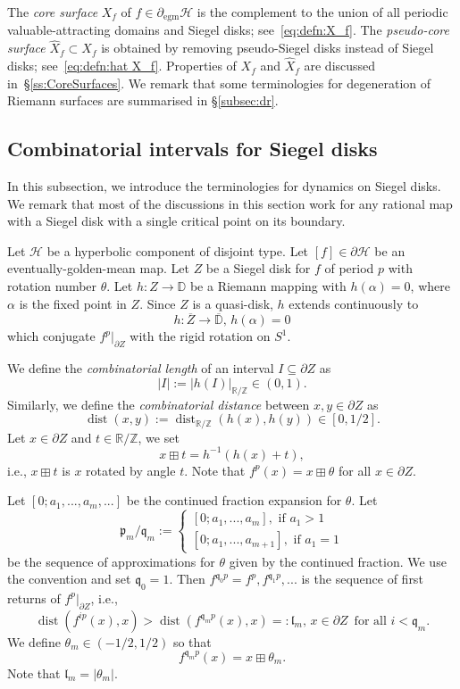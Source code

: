 \documentclass[11pt, reqno]{amsart}
\numberwithin{equation}{section}
\theoremstyle{plain}
\theoremstyle{theorem}
\theoremstyle{plain}
\theoremstyle{definition}
\newcommand{\R}{\mathbb{R}}
\newcommand{\Z}{\mathbb{Z}}
\newcommand{\D}{\mathbb{D}}
\DeclareMathOperator{\dist}{dist}
\numberwithin{figure}{section}
\newcommand{\egm}{{\operatorname{egm}}}
\begin{document}
The \emph{core surface} $X_f$ of $f\in \partial_\egm \mathcal H$ is the complement to the union of all periodic valuable-attracting domains and Siegel disks; see~\eqref{eq:defn:X_f}. The \emph{pseudo-core surface} $\widehat X_f\subset X_f$ is obtained by removing pseudo-Siegel disks instead of Siegel disks; see~\eqref{eq:defn:hat X_f}.  Properties of $X_f$ and $\widehat X_f$ are discussed in~\S\ref{ss:CoreSurfaces}.
We remark that some terminologies for degeneration of Riemann surfaces are summarised in \S \ref{subsec:dr}.


\subsection{Combinatorial intervals for Siegel disks}\label{subsec:ci}
In this subsection, we introduce the terminologies for dynamics on Siegel disks.
We remark that most of the discussions in this section work for any rational map with a Siegel disk with a single critical point on its boundary.

Let $\mathcal{H}$ be a hyperbolic component of disjoint type.
Let $[f] \in \partial \mathcal{H}$ be an eventually-golden-mean map.
Let $Z$ be a Siegel disk for $f$ of period $p$ with rotation number $\theta$.
Let $h: Z \longrightarrow \D$ be a Riemann mapping with $h(\alpha) = 0$, where $\alpha$ is the fixed point in $Z$.
Since $Z$ is a quasi-disk, $h$ extends continuously to
$$
h: \overline{Z} \longrightarrow \overline{\D}, \, h(\alpha) = 0
$$
which conjugate $f^p|_{\partial Z}$ with the rigid rotation on $S^1$.

We define the {\em combinatorial length} of an interval $I \subseteq \partial Z$ as
$$
\vert I \vert := \vert h(I)\vert_{\R/\Z} \in (0,1).
$$
Similarly, we define the {\em combinatorial distance} between $x, y \in \partial Z$ as
$$
\dist(x,y):= \dist_{\R/\Z}(h(x), h(y)) \in [0,1/2].
$$
Let $x \in \partial Z$ and $t\in \R/\Z$, we set
$$
x \boxplus t = h^{-1}(h(x) + t),
$$
i.e., $x \boxplus t$ is $x$ rotated by angle $t$.
Note that $f^p(x) = x \boxplus \theta$ for all $x\in \partial Z$.


Let $[0; a_1,..., a_m,...]$ be the continued fraction expansion for $\theta$.
Let $$
\mathfrak{p}_m/\mathfrak{q}_m :=
\begin{cases}
[0; a_1, ..., a_m], \text{ if }a_1 >1\\
[0; a_1, ..., a_{m+1}], \text{ if }a_1 = 1
\end{cases}
$$ 
be the sequence of approximations for $\theta$ given by the continued fraction.
We use the convention and set $\mathfrak{q}_0 = 1$.
Then $f^{\mathfrak{q}_0p} = f^p, f^{\mathfrak{q}_1p}, ...$ is the sequence of first returns of $f^p|_{\partial Z}$, i.e.,
$$
\dist(f^{ip}(x), x) > \dist(f^{\mathfrak{q}_mp}(x), x) =: \mathfrak{l}_m, \, x\in \partial Z \, \text{ for all } i < \mathfrak{q}_m.
$$
We define $\theta_m\in (-1/2, 1/2)$ so that
$$
f^{\mathfrak{q}_mp}(x) = x \boxplus \theta_m.
$$
Note that $\mathfrak{l}_m = \vert \theta_m\vert$.
\end{document}
